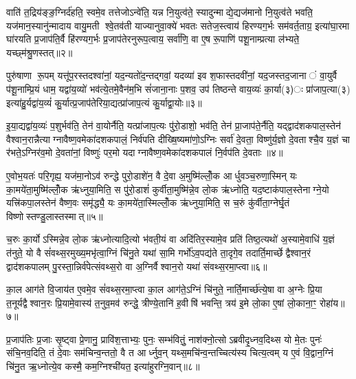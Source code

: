 वाति॑ त॒द्रिय॑ङ्ङ॒ग्निर्द॑हति॒ स्वमे॒व तत्तेजोऽन्वे॑ति॒ यन्न नि॒युत्व॑ते॒ स्यादुन्माद्ये॒द्यज॑मानो नि॒युत्व॑ते भवति॒ यज॑मान॒स्यानु॑न्मादाय वायु॒मती श्वे॒तव॑ती याज्यानुवा॒क्ये॑ भवतः सतेज॒स्त्वाय॑ हिरण्यग॒र्भः सम॑वर्त॒ताग्र॒ इत्या॑घा॒रमा घा॑रयति प्र॒जाप॑ति॒र्वै हि॑रण्यग॒र्भः प्र॒जाप॑तेरनुरूप॒त्वाय॒ सर्वा॑णि॒ वा ए॒ष रू॒पाणि॑ पशू॒नाम्प्रत्या ल॑भ्यते॒ यच्छ्म॑श्रु॒णस्तत्॥२॥

पुरु॑षाणा रू॒पम् यत्तू॑प॒रस्तदश्वा॑नां॒ यद॒न्यतो॑द॒न्तद्गवां॒ यदव्या॑ इव श॒फास्तदवी॑नां॒ यद॒जस्तद॒जानां वा॒युर्वै प॑शू॒नाम्प्रि॒यं धाम॒ यद्वा॑य॒व्यो॑ भव॑त्ये॒तमे॒वैन॑म॒भि सं॑जाना॒नाः प॒शव॒ उप॑ तिष्ठन्ते वाय॒व्यः॑ का॒र्या(३)ः प्रा॑जाप॒त्या(३) इत्या॑हु॒र्यद्वा॑य॒व्यं॑ कु॒र्यात्प्र॒जाप॑तेरिया॒द्यत्प्रा॑जाप॒त्यं कु॒र्याद्वा॒योः॥३॥

इ॒या॒द्यद्वा॑य॒व्यः॑ प॒शुर्भव॑ति॒ तेन॑ वा॒योर्नैति॒ यत्प्रा॑जाप॒त्यः पु॑रो॒डाशो॒ भव॑ति॒ तेन॑ प्रा॒जाप॑ते॒र्नैति॒ यद्द्वाद॑शकपाल॒स्तेन॑ वैश्वान॒रान्नैत्याग्नावैष्ण॒वमेका॑दशकपालं॒ निर्व॑पति दीख्षि॒ष्यमा॑णो॒ऽग्निः सर्वा॑ दे॒वता॒ विष्णु॑र्य॒ज्ञो दे॒वताश्चै॒व य॒ज्ञं चा र॑भते॒ऽग्निर॑व॒मो दे॒वता॑नां॒ विष्णुः॑ पर॒मो यदाग्नावैष्ण॒वमेका॑दशकपालं नि॒र्वप॑ति दे॒वताः॥४॥

ए॒वोभ॒यतः॑ परि॒गृह्य॒ यज॑मा॒नोऽव॑ रुन्द्धे पुरो॒डाशे॑न॒ वै दे॒वा अ॒मुष्मि॑ल्लोँ॒क आर्धुवञ्च॒रुणा॒स्मिन् यः का॒मये॑ता॒मुष्मि॑ल्लोँ॒क ऋ॑ध्नुया॒मिति॒ स पु॑रो॒डाशं॑ कुर्वीता॒मुष्मि॑न्ने॒व लो॒क ऋ॑ध्नोति॒ यद॒ष्टाक॑पाल॒स्तेनाग्ने॒यो यत्त्रि॑कपा॒लस्तेन॑ वैष्ण॒वः समृ॑द्ध्यै॒ यः का॒मये॑ता॒स्मिल्लोँ॒क ऋ॑ध्नुया॒मिति॒ स च॒रुं कु॑र्वीता॒ग्नेर्घृ॒तं विष्णोस्तण्डु॒लास्तस्मात्॥५॥

च॒रुः का॒र्योऽस्मिन्ने॒व लो॒क ऋ॑ध्नोत्यादि॒त्यो भ॑वती॒यं वा अदि॑तिर॒स्यामे॒व प्रति॑ तिष्ठ॒त्यथो॑ अ॒स्यामे॒वाधि॑ य॒ज्ञं त॑नुते॒ यो वै सं॑वथ्स॒रमुख्य॒मभृ॑त्वा॒ग्निं चि॑नु॒ते यथा॑ सा॒मि गर्भो॑ऽव॒पद्य॑ते ता॒दृगे॒व तदार्ति॒मार्च्छेद्वैश्वान॒रं द्वाद॑शकपालम् पु॒रस्ता॒न्निर्व॑पेत्संवथ्स॒रो वा अ॒ग्निर्वैश्वान॒रो यथा॑ संवथ्स॒रमा॒प्त्वा॥६॥

का॒ल आग॑ते वि॒जाय॑त ए॒वमे॒व सं॑वथ्स॒रमा॒प्त्वा का॒ल आग॑ते॒ऽग्निं चि॑नुते॒ नार्ति॒मार्च्छ॑त्ये॒षा वा अ॒ग्नेः प्रि॒या त॒नूर्यद्वैश्वान॒रः प्रि॒यामे॒वास्य॑ त॒नुव॒मव॑ रुन्द्धे॒ त्रीण्ये॒तानि॑ ह॒वीषि॑ भवन्ति॒ त्रय॑ इ॒मे लो॒का ए॒षां लो॒काना॒ꣳ॒ रोहा॑य॥७॥

{\anuvakamend[{य॒द्रिय॑ङ्वा॒युर्यच्छ्म॑श्रु॒णस्तद्वा॒योर्नि॒र्वप॑ति दे॒वता॒स्तस्मा॑दा॒प्त्वाष्टात्रिꣳ॑शच्च॥१॥}]}

प्र॒जाप॑तिः प्र॒जाः सृ॒ष्ट्वा प्रे॒णानु॒ प्रावि॑श॒त्ताभ्यः॒ पुनः॒ सम्भ॑वितुं॒ नाश॑क्नो॒त्सोऽब्रवीदृ॒ध्नव॒दिथ्स यो मे॒तः पुनः॑ संचि॒नव॒दिति॒ तं दे॒वाः सम॑चिन्व॒न्ततो॒ वै त आर्ध्नुव॒न् यथ्स॒मचि॑न्व॒न्तच्चित्य॑स्य चित्य॒त्वम् य ए॒वं वि॒द्वान॒ग्निं चि॑नु॒त ऋ॒ध्नोत्ये॒व कस्मै॒ कम॒ग्निश्ची॑यत॒ इत्या॑हुरग्नि॒वान्॥८॥

